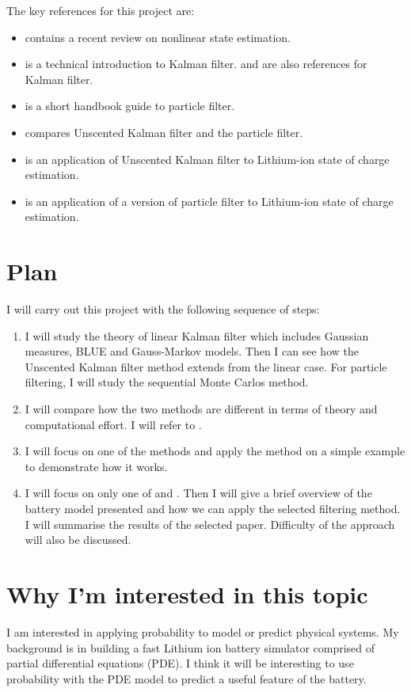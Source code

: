 \documentclass[]{STAT_547C}
\begin{document}
The key references for this project are:

\begin{itemize}
  \item \cite{Patwardhan:2012} contains a recent review on nonlinear state estimation.
  \item \cite{Sullivan:2015} is a technical introduction to Kalman filter. \cite{Maybeck:1982} and \cite{Welch:Bishop:2001} are also references for Kalman filter.
  \item \cite{Tulsyan:2016:ParticleFilter} is a short handbook guide to particle filter.
  \item \cite{Gyorgy:2014} compares Unscented Kalman filter and the particle filter.
  \item \cite{Sun:2011} is an application of Unscented Kalman filter to Lithium-ion state of charge estimation.
  \item \cite{Tulsyan:2016} is an application of a version of particle filter to Lithium-ion state of charge estimation.
\end{itemize}


\section{Plan}

I will carry out this project with the following sequence of steps: 
\begin{enumerate}
  
  \item I will study the theory of linear Kalman filter which includes Gaussian measures, BLUE and Gauss-Markov models. Then I can see how the Unscented Kalman filter method extends from the linear case. For particle filtering, I will study the sequential Monte Carlos method.
  
  \item I will compare how the two methods are different in terms of theory and computational effort. I will refer to \cite{Gyorgy:2014}. 

  \item I will focus on one of the methods and apply the method on a simple example to demonstrate how it works.
  
  \item I will focus on only one of \cite{Tulsyan:2016} and \cite{Sun:2011}. Then I will give a brief overview of the battery model presented and how we can apply the selected filtering method. I will summarise the results of the selected paper. Difficulty of the approach will also be discussed.
\end{enumerate}


\section{Why I'm interested in this topic}

I am interested in applying probability to model or predict physical systems. My background is in building a fast Lithium ion battery simulator comprised of partial differential equations (PDE). I think it will be interesting to use probability with the PDE model to predict a useful feature of the battery. 

\printbibliography
\end{document}
